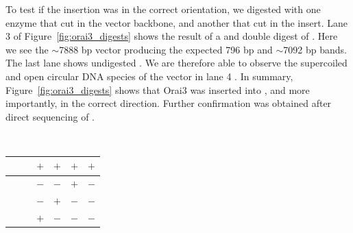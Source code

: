 To test if the insertion was in the correct orientation, we digested with one enzyme that cut in the vector backbone, and another that cut in the insert. 
Lane 3 of Figure~\ref{fig:orai3_digests} shows the result of a \kpni{} and \xhoi{} double digest of \oraiiiivector
. Here we see the $\sim$7888 bp vector producing the expected 796 bp and $\sim$7092 bp bands. 
The last lane shows undigested \oraiiiivector. We are therefore able to observe the  supercoiled and open circular DNA species of the vector in lane 4  \citep{Sambrook2001}.
In summary, Figure~\ref{fig:orai3_digests} shows that Orai3 was inserted into \puchygmt, and more importantly, in the correct direction. Further confirmation was obtained after direct sequencing of \oraiiiivector.

\newpage

{~}%
\begin{table}[!ht]\tiny 
\begin{center}\vspace{130pt} %
\resizebox{8.5cm}{!} {
\begin{tabular}{|l|l|l|l|l|}
\hline

{~}{~}{~}  & $+$ & $+$ & $+$ & $+$ \\ \hline
& $-$ & $-$ & $+$ & $-$ \\ \hline
& $-$ & $+$ & $-$ & $-$ \\ \hline
& $+$ & $-$ & $-$ & $-$ \\ \hline

\end{tabular}
}
\end{center}\vspace{-130pt} %
\end{table}%

